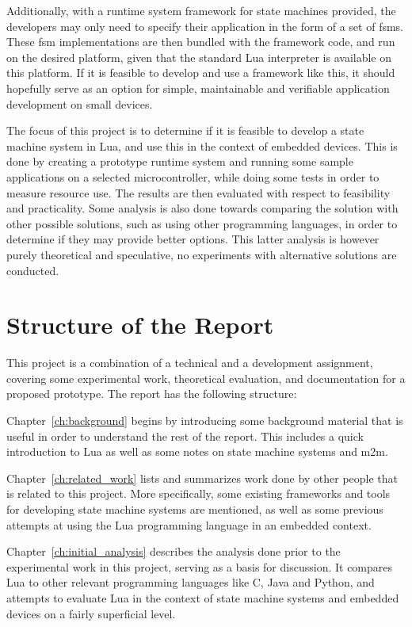 \noindent
Additionally, with a runtime system framework for state machines provided, the developers may only need to specify their application in the form of a set of \glspl{fsm}. These \gls{fsm} implementations are then bundled with the framework code, and run on the desired platform, given that the standard Lua interpreter is available on this platform. If it is feasible to develop and use a framework like this, it should hopefully serve as an option for simple, maintainable and verifiable application development on small devices.

\noindent
The focus of this project is to determine if it is feasible to develop a state machine system in Lua, and use this in the context of embedded devices. This is done by creating a prototype runtime system and running some sample applications on a selected microcontroller, while doing some tests in order to measure resource use. The results are then evaluated with respect to feasibility and practicality. Some analysis is also done towards comparing the solution with other possible solutions, such as using other programming languages, in order to determine if they may provide better options. This latter analysis is however purely theoretical and speculative, no experiments with alternative solutions are conducted.

\section{Structure of the Report}
\label{sec:structure}
This project is a combination of a technical and a development assignment, covering some experimental work, theoretical evaluation, and documentation for a proposed prototype. The report has the following structure:

\noindent
Chapter~\ref{ch:background} begins by introducing some background material that is useful in order to understand the rest of the report. This includes a quick introduction to Lua as well as some notes on state machine systems and \gls{m2m}.

\noindent
Chapter~\ref{ch:related_work} lists and summarizes work done by other people that is related to this project. More specifically, some existing frameworks and tools for developing state machine systems are mentioned, as well as some previous attempts at using the Lua programming language in an embedded context.

\noindent
Chapter~\ref{ch:initial_analysis} describes the analysis done prior to the experimental work in this project, serving as a basis for discussion. It compares Lua to other relevant programming languages like C, Java and Python, and attempts to evaluate Lua in the context of state machine systems and embedded devices on a fairly superficial level.

